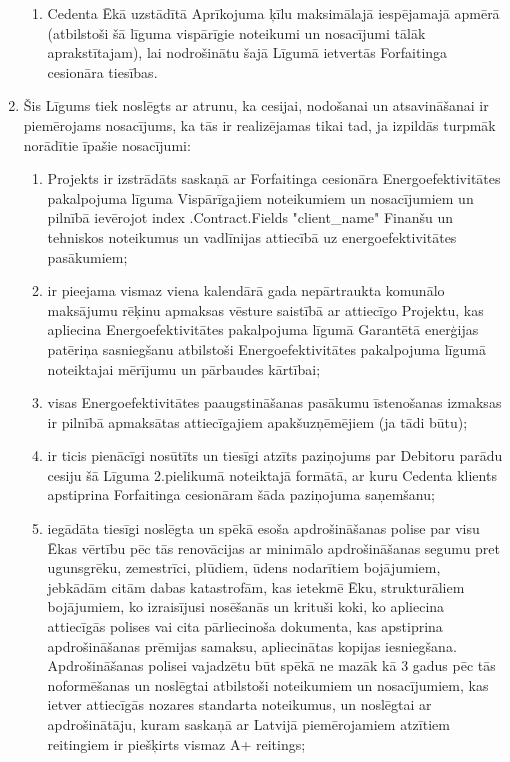 \documentclass[a4paper]{article}
\begin{document}
\begin{enumerate}
\begin{enumerate}
  \item{Cedenta Ēkā uzstādītā Aprīkojuma ķīlu maksimālajā iespējamajā apmērā
(atbilstoši šā līguma vispārīgie noteikumi un nosacījumi tālāk aprakstītajam), lai
nodrošinātu šajā Līgumā ietvertās Forfaitinga cesionāra tiesības.}
  \end{enumerate}

\item{Šis Līgums tiek noslēgts ar atrunu, ka cesijai, nodošanai un atsavināšanai ir piemērojams
nosacījums, ka tās ir realizējamas tikai tad, ja izpildās turpmāk norādītie īpašie nosacījumi:}

  \begin{enumerate}
  \item{Projekts ir izstrādāts saskaņā ar Forfaitinga cesionāra Energoefektivitātes
pakalpojuma līguma Vispārīgajiem noteikumiem un nosacījumiem un pilnībā ievērojot {{index .Contract.Fields "client_name"}}
Finanšu un tehniskos noteikumus un vadlīnijas attiecībā uz energoefektivitātes
pasākumiem;}

  \item{ir pieejama vismaz viena kalendārā gada nepārtraukta komunālo maksājumu rēķinu
apmaksas vēsture saistībā ar attiecīgo Projektu, kas apliecina Energoefektivitātes pakalpojuma
līgumā Garantētā enerģijas patēriņa sasniegšanu atbilstoši Energoefektivitātes pakalpojuma
līgumā noteiktajai mērījumu un pārbaudes kārtībai;}

  \item{visas Energoefektivitātes paaugstināšanas pasākumu īstenošanas izmaksas ir pilnībā
apmaksātas attiecīgajiem apakšuzņēmējiem (ja tādi būtu);}

  \item{ir ticis pienācīgi nosūtīts un tiesīgi atzīts paziņojums par Debitoru parādu cesiju šā Līguma
2.pielikumā noteiktajā formātā, ar kuru Cedenta klients apstiprina Forfaitinga cesionāram šāda
paziņojuma saņemšanu;}

  \item{iegādāta tiesīgi noslēgta un spēkā esoša apdrošināšanas polise par visu Ēkas vērtību pēc
tās renovācijas ar minimālo apdrošināšanas segumu pret ugunsgrēku, zemestrīci, plūdiem, ūdens
nodarītiem bojājumiem, jebkādām citām dabas katastrofām, kas ietekmē Ēku, strukturāliem
bojājumiem, ko izraisījusi nosēšanās un krituši koki, ko apliecina attiecīgās polises vai cita
pārliecinoša dokumenta, kas apstiprina apdrošināšanas prēmijas samaksu, apliecinātas kopijas
iesniegšana. Apdrošināšanas polisei vajadzētu būt spēkā ne mazāk kā 3 gadus pēc tās
noformēšanas un noslēgtai atbilstoši noteikumiem un nosacījumiem, kas ietver attiecīgās nozares
standarta noteikumus, un noslēgtai ar apdrošinātāju, kuram saskaņā ar Latvijā piemērojamiem
atzītiem reitingiem ir piešķirts vismaz A+ reitings;}


\end{enumerate}
\end{enumerate}
\end{document}
